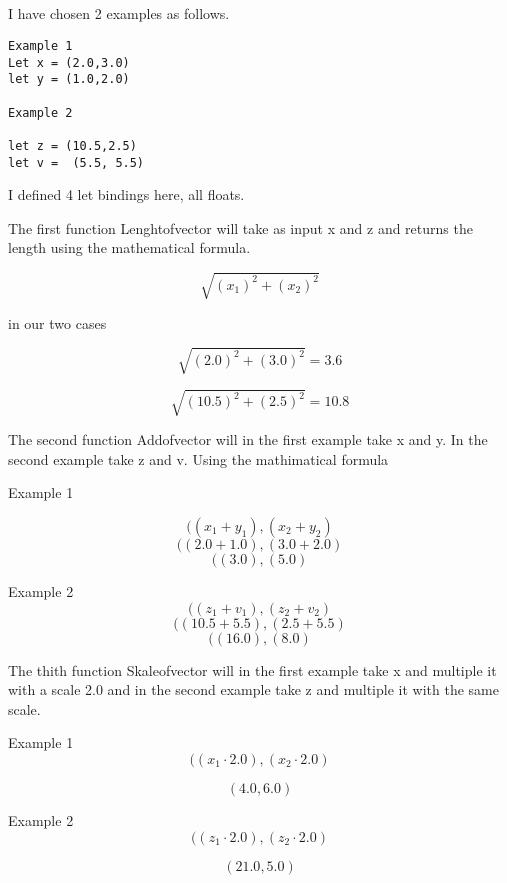 \documentclass{article}
\begin{document}
\subsection{}

I have chosen 2 examples as follows.

    \begin{lstlisting}
Example 1
Let x = (2.0,3.0)
let y = (1.0,2.0)

Example 2

let z = (10.5,2.5)
let v =  (5.5, 5.5)

    \end{lstlisting}

I defined 4 let bindings here, all floats. 

The first function Lenghtofvector will take as input x and z and returns the length using the mathematical formula.

$$ \sqrt{(x_1)^2 + (x_2)^2}$$

in our two cases

$$ \sqrt{(2.0)^2 + (3.0)^2} = 3.6$$

$$ \sqrt{(10.5)^2 + (2.5)^2} = 10.8 $$

The second function Addofvector will in the first example take x and y. In the second example take z and v. Using the mathimatical formula 

Example 1

$$((x_1 + y_1),(x_2+y_2)$$
$$((2.0 + 1.0),(3.0+2.0)$$
$$((3.0),(5.0)$$

Example 2
$$((z_1 + v_1),(z_2+v_2)$$
$$((10.5+ 5.5),(2.5+5.5)$$
$$((16.0),(8.0)$$

The thith function Skaleofvector will in the first example take x and multiple it with a scale 2.0 and in the second example take z and multiple it with the same scale.

Example 1
$$((x_1 \cdot 2.0) ,(x_2 \cdot 2.0)$$

$$(4.0,6.0)$$

Example 2
$$((z_1 \cdot 2.0) ,(z_2 \cdot 2.0)$$

$$(21.0,5.0)$$




\subsection{}
\end{document}
